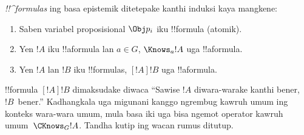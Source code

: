 \documentclass[../../../include/open-logic-section]{subfiles}
\begin{document}
\begin{defn}
  \emph{!!^{formula}s} ing basa epistemik ditetepake kanthi induksi
  kaya mangkene:
  \begin{enumerate}


  \item Saben variabel proposisional $\Obj p_i$ iku !!{formula} (atomik).






  \item Yen $!A$ iku !!a{formula} lan $a \in G$, $\Knows_a !A$
  uga !!a{formula}.
  
  \item Yen $!A$ lan $!B$ iku !!{formula}s, $[!A] !B$ uga !!a{formula}.

\end{enumerate}
\end{defn}

!!{formula} $[!A] !B$ dimaksudake diwaca ``Sawise $!A$ diwara-warake
kanthi bener, $!B$~bener.'' Kadhangkala uga migunani kanggo ngrembug
kawruh umum ing konteks wara-wara umum, mula basa iki uga bisa ngemot
operator kawruh umum~$\CKnows_G
!A$.
Tandha kutip ing wacan rumus ditutup.
\end{document}

